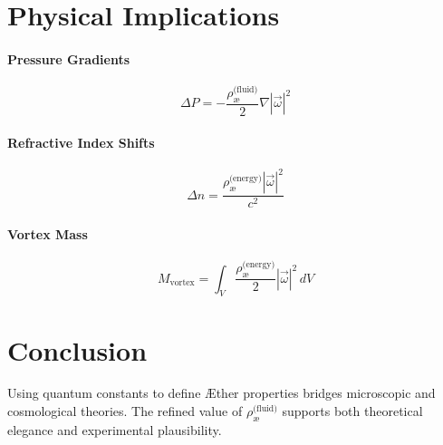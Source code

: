 \section{Physical Implications}

\paragraph{Pressure Gradients}
\[
\Delta P = -\frac{\rho_{\text{\ae}}^{\text{(fluid)}}}{2} \nabla |\vec{\omega}|^2
\]

\paragraph{Refractive Index Shifts}
\[
\Delta n = \frac{\rho_{\text{\ae}}^{\text{(energy)}} |\vec{\omega}|^2}{c^2}
\]

\paragraph{Vortex Mass}
\[
M_{\text{vortex}} = \int_V \frac{\rho_{\text{\ae}}^{\text{(energy)}}}{2} |\vec{\omega}|^2 \, dV
\]

\section{Conclusion}

Using quantum constants to define Æther properties bridges microscopic and cosmological theories. The refined value of $\rho_{\text{\ae}}^{\text{(fluid)}}$ supports both theoretical elegance and experimental plausibility.





